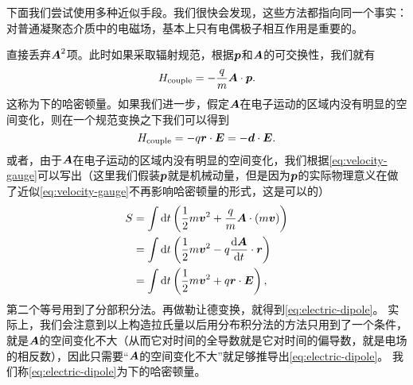 下面我们尝试使用多种近似手段。我们很快会发现，这些方法都指向同一个事实：对普通凝聚态介质中的电磁场，基本上只有电偶极子相互作用是重要的。

直接丢弃$\vb*{A}^2$项。此时如果采取辐射规范，根据$\vb*{p}$和$\vb*{A}$的可交换性，我们就有
\begin{equation}
    H_\text{couple} = - \frac{q}{m} \vb*{A} \cdot \vb*{p}.
    \label{eq:velocity-gauge}
\end{equation}
这称为下的哈密顿量。如果我们进一步，假定$\vb*{A}$在电子运动的区域内没有明显的空间变化，则在一个规范变换之下我们可以得到
\begin{equation}
    H_\text{couple} = - q \vb*{r} \cdot \vb*{E} = - \vb*{d} \cdot \vb*{E}.
    \label{eq:electric-dipole}
\end{equation}
或者，由于$\vb*{A}$在电子运动的区域内没有明显的空间变化，我们根据\eqref{eq:velocity-gauge}可以写出（这里我们假装$\vb*{p}$就是机械动量，但是因为$\vb*{p}$的实际物理意义在做了近似\eqref{eq:velocity-gauge}不再影响哈密顿量的形式，这是可以的）
\[
    \begin{aligned}
        S &= \int \dd{t} \left( \frac{1}{2} m \vb*{v}^2 + \frac{q}{m} \vb*{A} \cdot (m \vb*{v}) \right) \\
        &= \int \dd{t} \left( \frac{1}{2} m \vb*{v}^2 - q \dv{\vb*{A}}{t} \cdot \vb*{r} \right) \\
        &= \int \dd{t} \left( \frac{1}{2} m \vb*{v}^2 + q \vb*{r} \cdot \vb*{E} \right),
    \end{aligned} 
\]
第二个等号用到了分部积分法。再做勒让德变换，就得到\eqref{eq:electric-dipole}。
实际上，我们会注意到以上构造拉氏量以后用分布积分法的方法只用到了一个条件，就是$\vb*{A}$的空间变化不大（从而它对时间的全导数就是它对时间的偏导数，就是电场的相反数），因此只需要“$\vb*{A}$的空间变化不大”就足够推导出\eqref{eq:electric-dipole}。
我们称\eqref{eq:electric-dipole}为下的哈密顿量。

